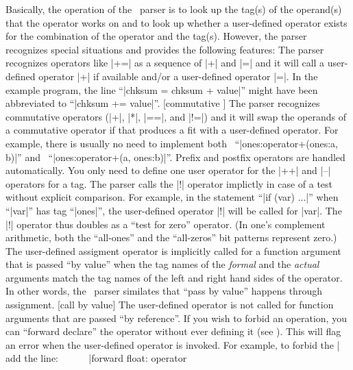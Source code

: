 Basically, the operation of the \Small\ parser is to look up the tag(s) of the
operand(s) that the operator works on and to look up whether a user-defined
operator exists for the combination of the operator and the tag(s). However,
the parser recognizes special situations and provides the following features:
\beginlist{1em} \compactlist
\list{\lbullet}
  The parser recognizes operators like |+=| as a sequence of |+| and |=| and
  it will call a user-defined operator |+| if available and\slash or a
  user-defined operator |=|. In the example program, the line
  ``|chksum = chksum + value|'' might have been abbreviated to
  ``|chksum += value|''.
\list{\lbullet}
   [commutative \midtilde]
  The parser recognizes commutative operators (|+|, |*|, |==|, and |!=|)
  and it will swap the operands of a commutative operator if that produces
  a fit with a user-defined operator. For example, there is usually no need to
  implement both \lbreak
  ~\quad ``|ones:operator+(ones:a, b)|'' \lbreak
  and
  ~\quad ``|ones:operator+(a, ones:b)|''.
\list{\lbullet}
  Prefix and postfix operators are handled automatically. You only need to
  define one user operator for the |++| and |--| operators for a tag.
\list{\lbullet}
  The parser calls the |!| operator implictly in case of a test without
  explicit comparison. For example, in the statement ``|if (var) ...|'' when
  ``|var|'' has tag ``|ones|'', the user-defined operator |!| will be called
  for |var|. The |!| operator thus doubles as a ``test for zero'' operator.
  (In one's complement arithmetic, both the ``all-ones'' and the ``all-zeros''
  bit patterns represent zero.)
\list{\lbullet}
  The user-defined assigment operator is implicitly called for a function argument
  that is passed ``by value'' when the tag names of the {\it formal\/} and the
  {\it actual\/} arguments match the tag names of the left and right hand sides of
  the operator. In other words, the \Small\ parser similates that ``pass by value''
  happens through assignment.  [call by value]
  The user-defined operator is not called for function arguments that are passed
  ``by reference''.
\list{\lbullet}
  If you wish to forbid an operation, you can ``forward declare'' the operator
  without ever defining it (see ). This will flag an
  error when the user-defined operator is invoked. For example, to forbid the
  |%
  add the line: \lbreak
  ~~~~~ |forward float: operator%
\endlist

